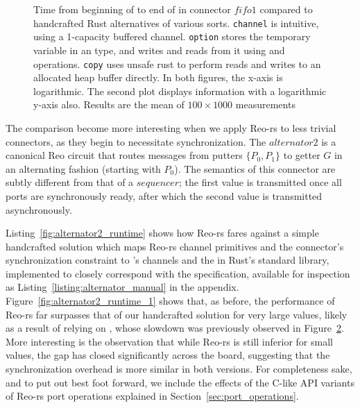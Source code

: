 \begin{figure}
{\begin{subfigure}[b]{0.63\textwidth}
			\caption{}
			\label{fig:exper_rtt_1}
		\end{subfigure}%
	}
	\caption[Performance of fifo1 connector vs.\ handcrafted Rust code.]{Time from beginning of  to end of  in connector $fifo1$ compared to handcrafted Rust alternatives of various sorts. \texttt{channel} is intuitive, using a  1-capacity buffered channel. \texttt{option} stores the temporary variable in an  type, and writes and reads from it using  and  operations. \texttt{copy} uses unsafe rust to perform reads and writes to an allocated heap buffer directly. In both figures, the x-axis is logarithmic. The second plot displays information with a logarithmic y-axis also. Results are the mean of $100\times{}1000$ measurements}
	\label{fig:exper_rtt}
\end{figure}

The comparison become more interesting when we apply Reo-rs to less trivial connectors, as they begin to necessitate synchronization. The $alternator2$ is a canonical Reo circuit that routes messages from putters $\{P_0, P_1\}$ to getter $G$ in an alternating fashion (starting with $P_0$). The semantics of this connector are subtly different from that of a $sequencer$; the first value is transmitted once all ports are synchronously ready, after which the second value is transmitted asynchronously.

Listing~\ref{fig:alternator2_runtime} shows how Reo-rs fares against a simple handcrafted solution which maps Reo-rs channel primitives and the connector's synchronization constraint to 's channels and the  in Rust's standard library, implemented to closely correspond with the specification, available for inspection as Listing~\ref{listing:alternator_manual} in the appendix. Figure~\ref{fig:alternator2_runtime_1} shows that, as before, the performance of Reo-rs far surpasses that of our handcrafted solution for very large values, likely as a result of relying on , whose slowdown was previously observed in Figure~\ref{fig:exper_rtt}. More interesting is the observation that while Reo-rs is still inferior for small values, the gap has closed significantly across the board, suggesting that the synchronization overhead is more similar in both versions. For completeness sake, and to put out best foot forward, we include the effects of the C-like  API variants of Reo-rs port operations explained in Section~\ref{sec:port_operations}.  

